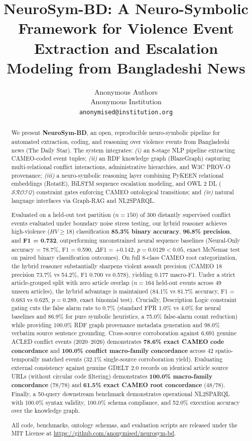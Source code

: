 \documentclass[11pt,a4paper]{article}
\title{
  \textbf{NeuroSym-BD: A Neuro-Symbolic Framework for Violence Event\\
  Extraction and Escalation Modeling from Bangladeshi News}
}
\author{
  Anonymous Authors\\
  Anonymous Institution\\
  \texttt{anonymised@institution.org}
}
\date{}
\begin{document}
\maketitle

\begin{abstract}
We present \textbf{NeuroSym-BD}, an open, reproducible neuro-symbolic pipeline for automated
extraction, coding, and reasoning over violence events from Bangladeshi
news (The Daily Star).
The system integrates:
\emph{(i)} an 8-stage NLP pipeline extracting CAMEO-coded event tuples;
\emph{(ii)} an RDF knowledge graph (BlazeGraph) capturing multi-relational conflict interactions,
  administrative hierarchies, and W3C PROV-O provenance;
\emph{(iii)} a neuro-symbolic reasoning layer combining PyKEEN relational embeddings (RotatE),
  BiLSTM sequence escalation modeling, and OWL 2 DL ($\mathcal{SROIQ}$) constraint gates
  enforcing CAMEO ontological transitions; and
\emph{(iv)} natural language interfaces via Graph-RAG and NL2SPARQL.

Evaluated on a held-out test partition ($n=150$) of 300 distantly supervised conflict events evaluated under boundary noise stress testing,
our hybrid reasoner achieves high-violence ($HV \ge 18$) classification \textbf{85.3\% binary accuracy}, \textbf{96.8\% precision}, and \textbf{F1 = 0.732},
outperforming unconstrained neural sequence baselines (Neural-Only accuracy = 78.7\%, F1 = 0.590, $\Delta$F1 = +0.142, $p = 0.0129 < 0.05$, exact McNemar test on paired binary classification outcomes).
On full 8-class CAMEO root categorization, the hybrid reasoner substantially sharpens violent assault precision (CAMEO 18 precision 73.7\% vs 54.2\%, F1 0.700 vs 0.578), yielding 0.177 macro-F1.
Under a strict article-grouped split with zero article overlap ($n=164$ held-out events across 49 unseen articles), the hybrid advantage is maintained (84.1\% vs 81.7\% accuracy, F1 = 0.683 vs 0.625, $p = 0.289$, exact binomial test).
Crucially, Description Logic constraint gating cuts the false alarm rate to 0.7\% (standard FPR 1.0\% vs 4.0\% for neural baselines and 86.9\% for pure symbolic heuristics, a 75.0\% false-alarm count reduction) while providing 100.0\% RDF graph provenance metadata generation and 98.0\% verbatim source sentence grounding.
Cross-source corroboration against 6,691 genuine ACLED conflict events (2020--2026) demonstrates \textbf{78.6\% exact CAMEO code concordance} and \textbf{100.0\% conflict macro-family concordance} across 42 spatio-temporally matched events (32.1\% single-source corroboration yield).
Evaluating external consistency against genuine GDELT 2.0 records on identical article source URLs (without circular code filtering) demonstrates \textbf{100.0\% macro-family concordance} (78/78) and \textbf{61.5\% exact CAMEO root concordance} (48/78).
Finally, a 50-query downstream benchmark demonstrates operational NL2SPARQL with 100.0\% syntax validity, 100.0\% schema compliance, and 52.0\% execution accuracy over the knowledge graph.

All code, benchmarks, ontology schemas, and evaluation scripts are released under the MIT License at
\url{https://github.com/anonymised/neurosym-bd}.
\end{abstract}
\end{document}

